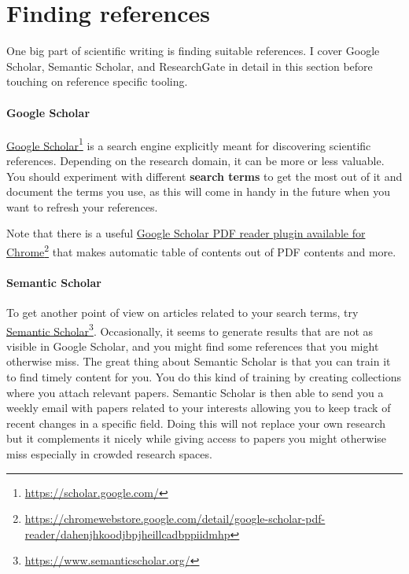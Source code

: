 \section{Finding references}

One big part of scientific writing is finding suitable references.
I cover Google Scholar, Semantic Scholar, and ResearchGate in detail in this section before touching on reference specific tooling.

\paragraph{Google Scholar}

\href{https://scholar.google.com/}{Google Scholar}\footnote{\url{https://scholar.google.com/}} is a search engine explicitly meant for discovering scientific references.
Depending on the research domain, it can be more or less valuable. You should experiment with different \textbf{search terms} to get the most out of it and document the terms you use, as this will come in handy in the future when you want to refresh your references.

Note that there is a useful \href{https://chromewebstore.google.com/detail/google-scholar-pdf-reader/dahenjhkoodjbpjheillcadbppiidmhp}{Google Scholar PDF reader plugin available for Chrome}\footnote{\url{https://chromewebstore.google.com/detail/google-scholar-pdf-reader/dahenjhkoodjbpjheillcadbppiidmhp}} that makes automatic table of contents out of PDF contents and more.

\paragraph{Semantic Scholar}

To get another point of view on articles related to your search terms, try \href{https://www.semanticscholar.org/}{Semantic Scholar}\footnote{\url{https://www.semanticscholar.org/}}.
Occasionally, it seems to generate results that are not as visible in Google Scholar, and you might find some references that you might otherwise miss.
The great thing about Semantic Scholar is that you can train it to find timely content for you.
You do this kind of training by creating collections where you attach relevant papers.
Semantic Scholar is then able to send you a weekly email with papers related to your interests allowing you to keep track of recent changes in a specific field.
Doing this will not replace your own research but it complements it nicely while giving access to papers you might otherwise miss especially in crowded research spaces.

